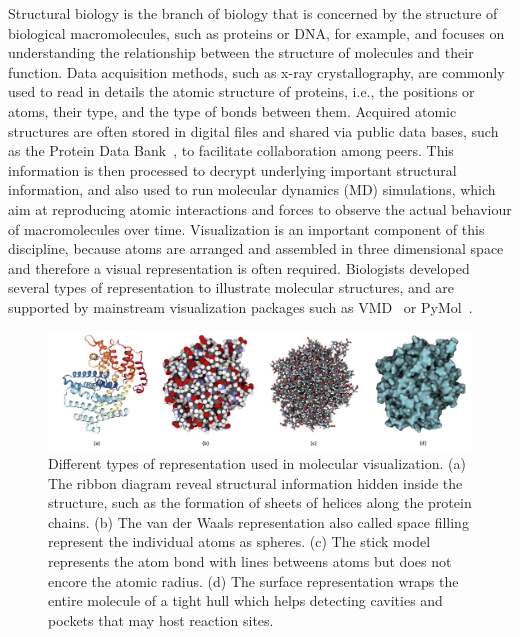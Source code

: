 Structural biology is the branch of biology that is concerned by the structure of biological macromolecules, such as proteins or DNA, for example, and focuses on understanding the relationship between the structure of molecules and their function.
Data acquisition methods, such as x-ray crystallography, are commonly used to read in details the atomic structure of proteins, i.e., the positions or atoms, their type, and the type of bonds between them.
Acquired atomic structures are often stored in digital files and shared via public data bases, such as the Protein Data Bank~\cite{bernstein1977protein}, to facilitate collaboration among peers.
This information is then processed to decrypt underlying important structural information, and also used to run molecular dynamics (MD) simulations, which aim at reproducing atomic interactions and forces to observe the actual behaviour of macromolecules over time.
Visualization is an important component of this discipline, because atoms are arranged and assembled in three dimensional space and therefore a visual representation is often required.
Biologists developed several types of representation to illustrate molecular structures, and are supported by mainstream visualization packages such as VMD~\cite{humphrey1996vmd} or PyMol~\cite{PyMOL}.



\begin{figure}
	
	\centering
	\includegraphics[width=.90\textwidth]{graphics/Picture13}
	
	\caption{Different types of representation used in molecular visualization. (a) The ribbon diagram reveal structural information hidden inside the structure, such as the formation of sheets of helices along the protein chains. (b) The van der Waals representation also called space filling represent the individual atoms as spheres. (c) The stick model represents the atom bond with lines betweens atoms but does not encore the atomic radius. (d) The surface representation wraps the entire molecule of a tight hull which helps detecting cavities and pockets that may host reaction sites. }
	\label{fig:representations}
	
\end{figure}

